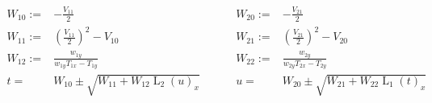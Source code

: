 \documentclass[10pt]{article}
\DeclareMathOperator{\Lspline}{L}
\begin{document}
$$\begin{aligned}
        W_{10} :=& -\frac{V_{11}}{2} & \hspace{1cm}
        W_{20} :=& -\frac{V_{21}}{2} \\
        W_{11} :=& \left(\frac{V_{11}}{2}\right)^2 - V_{10} & \hspace{1cm}
        W_{21} :=& \left(\frac{V_{21}}{2}\right)^2 - V_{20} \\
        W_{12} :=& \frac{w_{1y}}{ w_{1y}T_{1x}-T_{1y} } & \hspace{1cm}
        W_{22} :=& \frac{w_{2y}}{ w_{2y}T_{2x}-T_{2y} } \\
        t =& W_{10} \pm \sqrt{
            W_{11} + W_{12}\Lspline_2(u)_x
        } & \hspace{1cm}
        u =& W_{20} \pm \sqrt{
            W_{21} + W_{22}\Lspline_1(t)_x
        } \\

\end{aligned}$$
\end{document}
